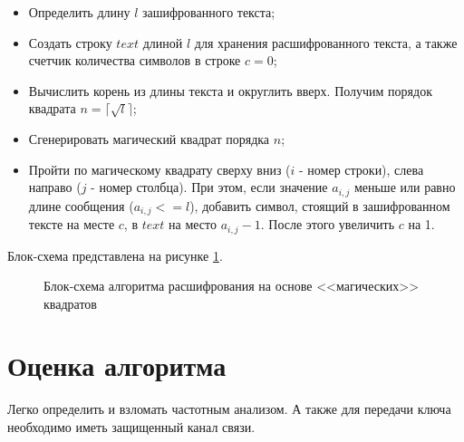 \documentclass[utf8x, 14pt, bold, times]{G7-32} %
\begin{document}
\begin{itemize}
\item Определить длину $l$ зашифрованного текста;
\item Создать строку $text$ длиной $l$ для хранения расшифрованного текста,
      а также счетчик количества символов в строке $c=0$;
\item Вычислить корень из длины текста и округлить вверх.
      Получим порядок квадрата $n = \lceil \sqrt{l} \rceil$; 
\item Сгенерировать магический квадрат порядка $n$;
\item Пройти по магическому квадрату сверху вниз ($i$ - номер строки),
      слева направо ($j$ - номер столбца). При этом, если значение
      $a_{i,j}$ меньше или равно длине сообщения ($a_{i,j} <= l$),
      добавить символ, стоящий в зашифрованном тексте на месте $c$,
      в $text$ на место $a_{i,j}-1$. После этого увеличить $c$ на 1. 
\end{itemize}

Блок-схема представлена на рисунке \ref{ris:magic-square-decrypt}.

\vspace{\baselineskip}
\begin{figure}[H]
    \caption{Блок-схема алгоритма расшифрования на основе <<магических>> квадратов}
\label{ris:magic-square-decrypt}
\end{figure}

\chapter{Оценка алгоритма}

Легко определить и взломать частотным анализом. А также
для передачи ключа необходимо иметь защищенный канал связи.
\end{document}
